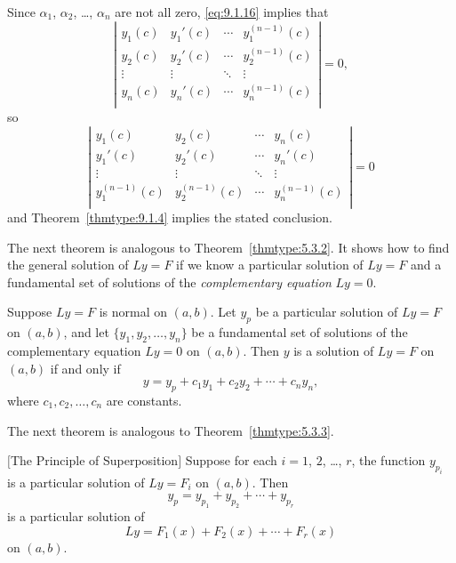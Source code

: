\proof Since $\alpha_{1}$, $\alpha_{2}$, \dots, $\alpha_{n}$ are not all zero, \eqref{eq:9.1.16}
implies that
\[
  \left|
  \begin{array}{ccccccc}
    y_{1}(c) & y_{1}'(c) & \cdots & y_{1}^{(n-1)}(c) \\
    y_{2}(c) & y_{2}'(c) & \cdots & y_{2}^{(n-1)}(c) \\
    \vdots   & \vdots    & \ddots & \vdots           \\
    y_{n}(c) & y_{n}'(c) & \cdots & y_{n}^{(n-1)}(c) \\
  \end{array}\right|=0,
\]
so
\[
  \left|
  \begin{array}{cccccc}
    y_{1}(c)         & y_{2}(c)            & \cdots & y_{n}(c)            \\
    y_{1}'(c)        & y_{2}'(c)           & \cdots & y_{n}'(c)           \\
    \vdots           & \vdots              & \ddots & \vdots              \\
    y_{1}^{(n-1)}(c) & y_{2}^{(n-1)}(c) & \cdots & y_{n}^{(n-1)}(c) \\
  \end{array}\right|=0
\]
\nopagebreak
and Theorem~\ref{thmtype:9.1.4} implies the stated conclusion.


\noindent
The next theorem is analogous to Theorem~\ref{thmtype:5.3.2}. It shows how to find the general
solution of $Ly=F$ if we know a particular solution of $Ly=F$ and a fundamental set of solutions of
the {\color{blue}\it complementary equation\/} $Ly=0$.

\begin{theorem}
  \color{blue}
  \label{thmtype:9.1.6} Suppose $Ly=F$ is normal on $(a,b)$. Let $y_{p}$ be a particular solution of
  $Ly=F$ on $(a,b)$, and let $\{y_{1},y_{2},\dots,y_{n}\}$ be a fundamental set of solutions of the
  complementary equation $Ly=0$ on $(a,b)$. Then $y$ is a solution of $Ly=F$ on $(a,b)$ if and only
  if
  \[
    y=y_{p}+c_{1}y_{1}+c_{2}y_{2}+\cdots+c_{n}y_{n},
  \]
  where $c_{1},c_{2},\dots,c_{n}$ are constants.
\end{theorem}

The next theorem is analogous to Theorem~\ref{thmtype:5.3.3}.

\begin{theorem}
  \color{blue}
  $[$The Principle of Superposition$]$\label{thmtype:9.1.7} Suppose for each $i=1$, $2$, \dots, $r$,
  the function $y_{p_{i}}$ is a particular solution of $Ly=F_{i}$ on $(a,b)$. Then
  \[
    y_{p}=y_{p_{1}}+y_{p_{2}}+\cdots+y_{p_{r}}
  \]
  is a particular solution of
  \[
    Ly=F_{1}(x)+F_{2}(x)+\cdots+F_{r}(x)
  \]
  on $(a,b)$.
\end{theorem}

